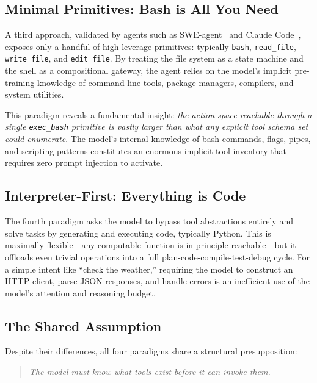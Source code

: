 \documentclass[11pt]{article}
\begin{document}
\subsection{Minimal Primitives: Bash is All You Need}
\label{sec:minimal-primitives}

A third approach, validated by agents such as SWE-agent~\citep{sweagent2024} and Claude Code~\citep{shihipar2026bash}, exposes only a handful of high-leverage primitives: typically \texttt{bash}, \texttt{read\_file}, \texttt{write\_file}, and \texttt{edit\_file}.
By treating the file system as a state machine and the shell as a compositional gateway, the agent relies on the model's implicit pre-training knowledge of command-line tools, package managers, compilers, and system utilities.

This paradigm reveals a fundamental insight: \emph{the action space reachable through a single \texttt{exec\_bash} primitive is vastly larger than what any explicit tool schema set could enumerate}.
The model's internal knowledge of bash commands, flags, pipes, and scripting patterns constitutes an enormous implicit tool inventory that requires zero prompt injection to activate.

\subsection{Interpreter-First: Everything is Code}
\label{sec:interpreter-first}

The fourth paradigm asks the model to bypass tool abstractions entirely and solve tasks by generating and executing code, typically Python.
This is maximally flexible---any computable function is in principle reachable---but it offloads even trivial operations into a full plan-code-compile-test-debug cycle.
For a simple intent like ``check the weather,'' requiring the model to construct an HTTP client, parse JSON responses, and handle errors is an inefficient use of the model's attention and reasoning budget.

\subsection{The Shared Assumption}
\label{sec:shared-assumption}

Despite their differences, all four paradigms share a structural presupposition:

\begin{quote}
\emph{The model must know what tools exist before it can invoke them.}
\end{quote}
\end{document}
